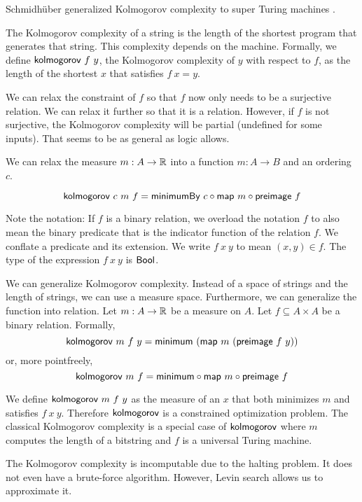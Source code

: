 Schmidh\"uber generalized Kolmogorov complexity to super Turing machines \cite{SchmidhuberKolmogorov}.

The Kolmogorov complexity of a string
is the length of the shortest program that generates that string.
This complexity depends on the machine.
Formally, we define \(\textsf{kolmogorov}~f~y\),
the Kolmogorov complexity of \(y\) with respect to \(f\),
as the length of the shortest \(x\) that satisfies \(f~x = y\).

We can relax the constraint of \(f\) so that \(f\)
now only needs to be a surjective relation.
We can relax it further so that it is a relation.
However, if \(f\) is not surjective,
the Kolmogorov complexity will be partial
(undefined for some inputs).
That seems to be as general as logic allows.

We can relax the measure \(m : A \to \mathbb{R}\) into a function \(m : A \to B\)
and an ordering \(c\).

\[
    \textsf{kolmogorov}~c~m~f = \textsf{minimumBy}~c \circ \textsf{map}~m \circ \textsf{preimage}~f
\]

Note the notation:
If \(f\) is a binary relation,
we overload the notation \(f\)
to also mean the binary predicate
that is the indicator function of the relation \(f\).
We conflate a predicate and its extension.
We write \(f~x~y\) to mean \((x,y) \in f\).
The type of the expression \(f~x~y\) is \(\textsf{Bool}\).

We can generalize Kolmogorov complexity.
Instead of a space of strings and the length of strings,
we can use a measure space.
Furthermore, we can generalize the function into relation.
Let \(m : A \to \mathbb{R}\) be a measure on \(A\).
Let \(f \subseteq A \times A\) be a binary relation.
Formally,
\[
    \textsf{kolmogorov}~m~f~y = \textsf{minimum}~(\textsf{map}~m~(\textsf{preimage}~f~y))
\]
or, more pointfreely,
\begin{equation}
    \textsf{kolmogorov}~m~f = \textsf{minimum} \circ \textsf{map}~m \circ \textsf{preimage}~f
\end{equation}

We define \(\textsf{kolmogorov}~m~f~y\) as the measure of an \(x\)
that both minimizes \(m\) and satisfies \(f~x~y\).
Therefore \(\textsf{kolmogorov}\) is a constrained optimization problem.
The classical Kolmogorov complexity is a special case of \(\textsf{kolmogorov}\)
where \(m\) computes the length of a bitstring
and \(f\) is a universal Turing machine.

The Kolmogorov complexity is incomputable due to the halting problem.
It does not even have a brute-force algorithm.
However, Levin search allows us to approximate it.

